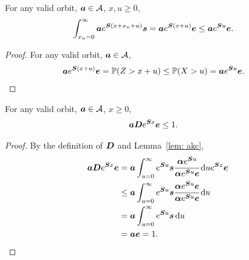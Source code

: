 \begin{lem}\label{lem: akc}
For any valid orbit, \(\boldsymbol a\in\mathcal A\), \(x,u\geq 0\), 
        \begin{align*}
        		\int_{x_n=0}^\infty \boldsymbol a e^{\boldsymbol{S}(x+x_n+u)}\boldsymbol s = \boldsymbol a e^{\boldsymbol{S}(x+u)}\boldsymbol e &\leq \boldsymbol a e^{\boldsymbol{S}u}\boldsymbol e. 
	\end{align*}
\end{lem}
\begin{proof}
	For any valid orbit, \(\boldsymbol a\in\mathcal A\), 
        \begin{align*}
        		\boldsymbol a e^{\boldsymbol{S}(x+u)}\boldsymbol e &= \mathbb P(Z>x+u) \leq\mathbb P(X>u) = \boldsymbol a e^{\boldsymbol Su} \boldsymbol e. 
	\end{align*}
\end{proof}
\begin{lem}\label{lem:macmnm}
	For any valid orbit, \(\boldsymbol a\in\mathcal A\), \(x\geq 0\), 
        \begin{align*}
        		\boldsymbol a\boldsymbol D e^{\boldsymbol{S}x}\boldsymbol e &\leq 1. 
	\end{align*}
\end{lem}
\begin{proof}
By the definition of \(\boldsymbol D\) and Lemma~\ref{lem: akc},
	\begin{align*}
        		\boldsymbol a\boldsymbol D e^{\boldsymbol{S}x}\boldsymbol e &= \boldsymbol a \int_{u=0}^\infty e^{\boldsymbol Su}\boldsymbol s\cfrac{\boldsymbol \alpha e^{\boldsymbol Su}}{\boldsymbol \alpha e^{\boldsymbol Su}\boldsymbol e}\, \mathrm{d} ue^{\boldsymbol{S}x}\boldsymbol e
		\\& \leq \boldsymbol a \int_{u=0}^\infty e^{\boldsymbol Su}\boldsymbol s\cfrac{\boldsymbol \alpha e^{\boldsymbol Su}\boldsymbol e}{\boldsymbol \alpha e^{\boldsymbol Su}\boldsymbol e}\, \mathrm{d} u
		\\& = \boldsymbol a \int_{u=0}^\infty e^{\boldsymbol Su}\boldsymbol s\, \mathrm{d} u
		\\& = \boldsymbol a \boldsymbol e = 1.
	\end{align*}
\end{proof}

